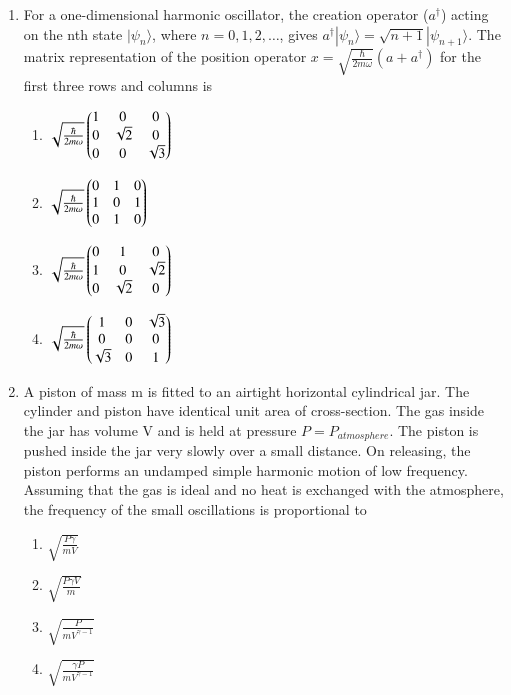 \documentclass[journal,12pt,onecolumn]{IEEEtran}
\theoremstyle{remark}
\begin{document}
\begin{enumerate}
\item
For a one-dimensional harmonic oscillator, the creation operator ($a^\dagger$) acting on the nth state $|\psi_n\rangle$, where $n = 0, 1, 2, \dots$, gives $a^\dagger|\psi_n\rangle = \sqrt{n + 1}|\psi_{n+1}\rangle$. The matrix representation of the position operator $x = \sqrt{\frac{\hbar}{2m\omega}}(a + a^\dagger)$ for the first three rows and columns is
\begin{enumerate}
    \item $\sqrt{\frac{\hbar}{2m\omega}} \begin{pmatrix} 1 & 0 & 0 \\ 0 & \sqrt{2} & 0 \\ 0 & 0 & \sqrt{3} \end{pmatrix}$
    \item $\sqrt{\frac{\hbar}{2m\omega}} \begin{pmatrix} 0 & 1 & 0 \\ 1 & 0 & 1 \\ 0 & 1 & 0 \end{pmatrix}$
    \item $\sqrt{\frac{\hbar}{2m\omega}} \begin{pmatrix} 0 & 1 & 0 \\ 1 & 0 & \sqrt{2} \\ 0 & \sqrt{2} & 0 \end{pmatrix}$
    \item $\sqrt{\frac{\hbar}{2m\omega}} \begin{pmatrix} 1 & 0 & \sqrt{3} \\ 0 & 0 & 0 \\ \sqrt{3} & 0 & 1 \end{pmatrix}$
\end{enumerate}


\item
A piston of mass m is fitted to an airtight horizontal cylindrical jar. The cylinder and piston have identical unit area of cross-section. The gas inside the jar has volume V and is held at pressure $P = P_{atmosphere}$. The piston is pushed inside the jar very slowly over a small distance. On releasing, the piston performs an undamped simple harmonic motion of low frequency. Assuming that the gas is ideal and no heat is exchanged with the atmosphere, the frequency of the small oscillations is proportional to
\begin{enumerate}
    \item $\sqrt{\frac{P\gamma}{mV}}$
    \item $\sqrt{\frac{P\gamma V}{m}}$
    \item $\sqrt{\frac{P}{mV^{\gamma-1}}}$
    \item $\sqrt{\frac{\gamma P}{mV^{\gamma-1}}}$
\end{enumerate}



\end{enumerate}
\end{document}
